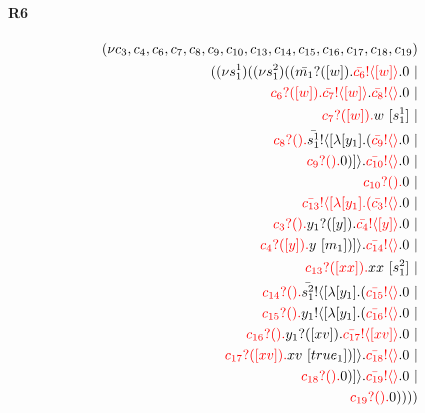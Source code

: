 \documentclass{article}
\begin{document}
\begin{align*}
\end{align*}
\paragraph{R6}
\begin{align*}
 (\nu c_{3},c_{4},c_{6},c_{7},c_{8},c_{9},c_{10},c_{13},c_{14},c_{15},c_{16},c_{17},c_{18},c_{19}) \\ ( (\nu s^{1}_{1})( (\nu s^{2}_{1})((\color{black}\bar{m_{1}}?([w]).\color{black}\color{red}\bar{c_{6}}! \langle [w] \rangle \color{black}.0  \ | \\ \color{red}c_{6}?([w]).\color{black}\color{red}\bar{c_{7}}! \langle [w] \rangle \color{black}.\color{red}\bar{c_{8}}! \langle  \rangle \color{black}.0  \ | \\ \color{red}c_{7}?([w]).\color{black}w \ [s^{1}_{1}] \ | \\ \color{red}c_{8}?().\color{black}\color{black}\bar{s^{1}_{1}}! \langle [ \lambda [y_{1}].(\color{red}\bar{c_{9}}! \langle  \rangle \color{black}.0  \ | \\ \color{red}c_{9}?().\color{black}0 )] \rangle \color{black}.\color{red}\bar{c_{10}}! \langle  \rangle \color{black}.0  \ | \\ \color{red}c_{10}?().\color{black}0  \ | \\ \color{red}\bar{c_{13}}! \langle [ \lambda [y_{1}].(\color{red}\bar{c_{3}}! \langle  \rangle \color{black}.0  \ | \\ \color{red}c_{3}?().\color{black}\color{black}y_{1}?([y]).\color{black}\color{red}\bar{c_{4}}! \langle [y] \rangle \color{black}.0  \ | \\ \color{red}c_{4}?([y]).\color{black}y \ [m_{1}])] \rangle \color{black}.\color{red}\bar{c_{14}}! \langle  \rangle \color{black}.0  \ | \\ \color{red}c_{13}?([xx]).\color{black}xx \ [s^{2}_{1}] \ | \\ \color{red}c_{14}?().\color{black}\color{black}\bar{s^{2}_{1}}! \langle [ \lambda [y_{1}].(\color{red}\bar{c_{15}}! \langle  \rangle \color{black}.0  \ | \\ \color{red}c_{15}?().\color{black}\color{black}y_{1}! \langle [ \lambda [y_{1}].(\color{red}\bar{c_{16}}! \langle  \rangle \color{black}.0  \ | \\ \color{red}c_{16}?().\color{black}\color{black}y_{1}?([xv]).\color{black}\color{red}\bar{c_{17}}! \langle [xv] \rangle \color{black}.0  \ | \\ \color{red}c_{17}?([xv]).\color{black}xv \ [true_{1}])] \rangle \color{black}.\color{red}\bar{c_{18}}! \langle  \rangle \color{black}.0  \ | \\ \color{red}c_{18}?().\color{black}0 )] \rangle \color{black}.\color{red}\bar{c_{19}}! \langle  \rangle \color{black}.0  \ | \\ \color{red}c_{19}?().\color{black}0 ))))
\end{align*}
\end{document}
